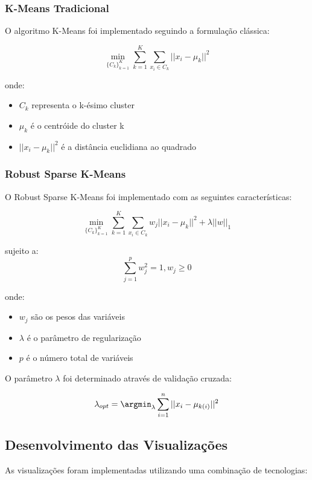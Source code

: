 \documentclass[conference]{IEEEtran}
\begin{document}
\subsubsection{K-Means Tradicional}
O algoritmo K-Means foi implementado seguindo a formulação clássica:

\begin{equation}
\min_{\{C_k\}_{k=1}^K} \sum_{k=1}^K \sum_{x_i \in C_k} ||x_i - \mu_k||^2
\end{equation}

onde:
\begin{itemize}
\item $C_k$ representa o k-ésimo cluster
\item $\mu_k$ é o centróide do cluster k
\item $||x_i - \mu_k||^2$ é a distância euclidiana ao quadrado
\end{itemize}

\subsubsection{Robust Sparse K-Means}
O Robust Sparse K-Means foi implementado com as seguintes características:

\begin{equation}
\min_{\{C_k\}_{k=1}^K} \sum_{k=1}^K \sum_{x_i \in C_k} w_j||x_i - \mu_k||^2 + \lambda||w||_1
\end{equation}

sujeito a:
\begin{equation}
\sum_{j=1}^p w_j^2 = 1, w_j \geq 0
\end{equation}

onde:
\begin{itemize}
\item $w_j$ são os pesos das variáveis
\item $\lambda$ é o parâmetro de regularização
\item $p$ é o número total de variáveis
\end{itemize}

O parâmetro $\lambda$ foi determinado através de validação cruzada:

\begin{equation}
\lambda_{opt} = \argmin_{\lambda} \sum_{i=1}^n ||x_i - \mu_{k(i)}||^2
\end{equation}

\subsection{Desenvolvimento das Visualizações}
As visualizações foram implementadas utilizando uma combinação de tecnologias:
\end{document}
